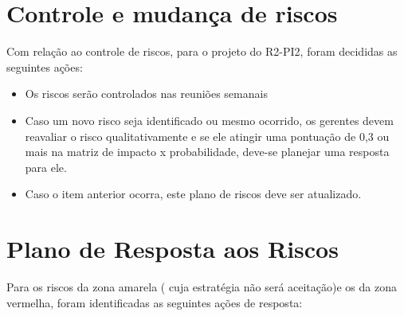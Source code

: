 \section{Controle e mudança de riscos} %
\label{sec:controle_e_mudança_de_riscos}

	Com relação ao controle de riscos, para o projeto do R2-PI2, foram decididas as seguintes ações: 
	\begin{itemize}
		\item Os riscos serão controlados nas reuniões semanais
		\item Caso um novo risco seja identificado ou mesmo ocorrido, os gerentes devem reavaliar o risco qualitativamente e se ele atingir uma pontuação de 0,3 ou mais na matriz de impacto x probabilidade, deve-se planejar uma resposta para ele.
		\item Caso o item anterior ocorra, este plano de riscos deve ser atualizado.
	\end{itemize}

\section{Plano de Resposta aos Riscos} %
\label{sec:plano_de_resposta_aos_riscos}

	Para os riscos da zona amarela ( cuja estratégia não será aceitação)e os da zona vermelha, foram identificadas as seguintes ações de resposta:

